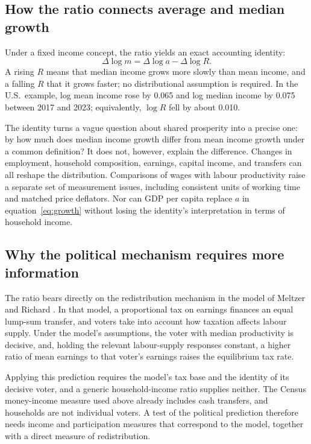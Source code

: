 \documentclass[11pt,a4paper]{article}
\begin{document}
\subsection{How the ratio connects average and median growth}

Under a fixed income concept, the ratio yields an exact accounting identity:
\begin{equation}
\Delta\log m=\Delta\log a-\Delta\log R.
\label{eq:growth}
\end{equation}
A rising $R$ means that median income grows more slowly than mean income, and a falling $R$ that it grows faster; no distributional assumption is required. In the U.S.\ example, log mean income rose by 0.065 and log median income by 0.075 between 2017 and 2023; equivalently, $\log R$ fell by about 0.010.

The identity turns a vague question about shared prosperity into a precise one: by how much does median income growth differ from mean income growth under a common definition? It does not, however, explain the difference. Changes in employment, household composition, earnings, capital income, and transfers can all reshape the distribution. Comparisons of wages with labour productivity raise a separate set of measurement issues, including consistent units of working time and matched price deflators. Nor can GDP per capita replace $a$ in equation~\eqref{eq:growth} without losing the identity's interpretation in terms of household income.


\subsection{Why the political mechanism requires more information}
\label{sec:politics}

The ratio bears directly on the redistribution mechanism in the model of Meltzer and Richard \cite{meltzer}. In that model, a proportional tax on earnings finances an equal lump-sum transfer, and voters take into account how taxation affects labour supply. Under the model's assumptions, the voter with median productivity is decisive, and, holding the relevant labour-supply responses constant, a higher ratio of mean earnings to that voter's earnings raises the equilibrium tax rate.

Applying this prediction requires the model's tax base and the identity of its decisive voter, and a generic household-income ratio supplies neither. The Census money-income measure used above already includes cash transfers, and households are not individual voters. A test of the political prediction therefore needs income and participation measures that correspond to the model, together with a direct measure of redistribution.
\end{document}
